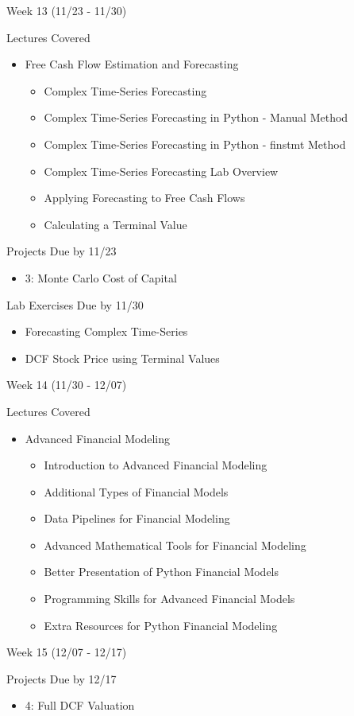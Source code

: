 \documentclass[]{article}
\begin{document}
\begin{section}{Week 13 (11/23 - 11/30)}
\begin{subsection}{Lectures Covered}
\begin{itemize}
\item Free Cash Flow Estimation and Forecasting
\begin{itemize}
\item Complex Time-Series Forecasting
\item Complex Time-Series Forecasting in Python - Manual Method
\item Complex Time-Series Forecasting in Python - finstmt Method
\item Complex Time-Series Forecasting Lab Overview
\item Applying Forecasting to Free Cash Flows
\item Calculating a Terminal Value
\end{itemize}
\end{itemize}
\end{subsection}
\begin{subsection}{Projects Due by 11/23}
\begin{itemize}
\item 3: Monte Carlo Cost of Capital
\end{itemize}
\end{subsection}
\begin{subsection}{Lab Exercises Due by 11/30}
\begin{itemize}
\item Forecasting Complex Time-Series
\item DCF Stock Price using Terminal Values
\end{itemize}
\end{subsection}
\end{section}
\begin{section}{Week 14 (11/30 - 12/07)}
\begin{subsection}{Lectures Covered}
\begin{itemize}
\item Advanced Financial Modeling
\begin{itemize}
\item Introduction to Advanced Financial Modeling
\item Additional Types of Financial Models
\item Data Pipelines for Financial Modeling
\item Advanced Mathematical Tools for Financial Modeling
\item Better Presentation of Python Financial Models
\item Programming Skills for Advanced Financial Models
\item Extra Resources for Python Financial Modeling
\end{itemize}
\end{itemize}
\end{subsection}
\end{section}
\begin{section}{Week 15 (12/07 - 12/17)}
\begin{subsection}{Projects Due by 12/17}
\begin{itemize}
\item 4: Full DCF Valuation
\end{itemize}
\end{subsection}
\end{section}
\end{document}
